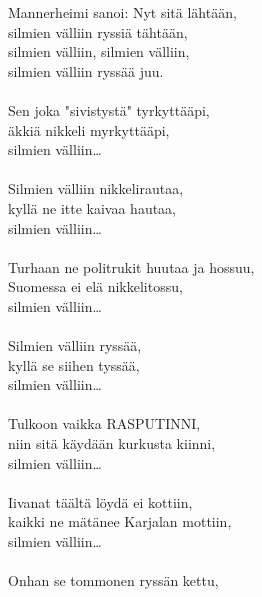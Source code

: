 
            Mannerheimi sanoi: Nyt sitä lähtään, \\
            silmien välliin ryssiä tähtään, \\
            silmien välliin, silmien välliin, \\
            silmien välliin ryssää juu. \\
\hspace{10mm} \\
            Sen joka "sivistystä" tyrkyttääpi, \\
            äkkiä nikkeli myrkyttääpi, \\
            silmien välliin… \\
\hspace{10mm} \\
            Silmien välliin nikkelirautaa, \\
            kyllä ne itte kaivaa hautaa, \\
            silmien välliin… \\
\hspace{10mm} \\
            Turhaan ne politrukit huutaa ja hossuu, \\
            Suomessa ei elä nikkelitossu, \\
            silmien välliin… \\
\hspace{10mm} \\
            Silmien välliin ryssää, \\
            kyllä se siihen tyssää, \\
            silmien välliin… \\
\hspace{10mm} \\
            Tulkoon vaikka RASPUTINNI, \\
            niin sitä käydään kurkusta kiinni, \\
            silmien välliin… \\
\hspace{10mm} \\
            Iivanat täältä löydä ei kottiin, \\
            kaikki ne mätänee Karjalan mottiin, \\
            silmien välliin… \\
\hspace{10mm} \\
            Onhan se tommonen ryssän kettu, \\
